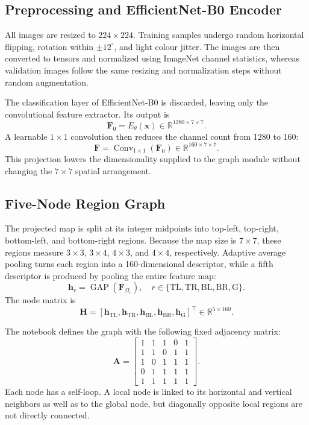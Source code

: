 \documentclass[10pt,conference]{IEEEtran}
\begin{document}
\subsection{Preprocessing and EfficientNet-B0 Encoder}

All images are resized to $224\times224$. Training samples undergo random horizontal flipping, rotation within $\pm12^{\circ}$, and light colour jitter. The images are then converted to tensors and normalized using ImageNet channel statistics, whereas validation images follow the same resizing and normalization steps without random augmentation.

The classification layer of EfficientNet-B0 is discarded, leaving only the convolutional feature extractor. Its output is
\begin{equation}
\mathbf{F}_{0}=E_{\theta}(\mathbf{x})
\in\mathbb{R}^{1280\times7\times7}.
\end{equation}
A learnable $1\times1$ convolution then reduces the channel count from 1280 to 160:
\begin{equation}
\mathbf{F}=\operatorname{Conv}_{1\times1}(\mathbf{F}_{0})
\in\mathbb{R}^{160\times7\times7}.
\end{equation}
This projection lowers the dimensionality supplied to the graph module without changing the $7\times7$ spatial arrangement.

\subsection{Five-Node Region Graph}

The projected map is split at its integer midpoints into top-left, top-right, bottom-left, and bottom-right regions. Because the map size is $7\times7$, these regions measure $3\times3$, $3\times4$, $4\times3$, and $4\times4$, respectively. Adaptive average pooling turns each region into a 160-dimensional descriptor, while a fifth descriptor is produced by pooling the entire feature map:
\begin{equation}
\mathbf{h}_{r}=\operatorname{GAP}(\mathbf{F}_{\Omega_r}),
\quad r\in\{\mathrm{TL,TR,BL,BR,G}\}.
\end{equation}
The node matrix is
\begin{equation}
\mathbf{H}=[\mathbf{h}_{\mathrm{TL}},\mathbf{h}_{\mathrm{TR}},
\mathbf{h}_{\mathrm{BL}},\mathbf{h}_{\mathrm{BR}},\mathbf{h}_{\mathrm{G}}]^{\top}
\in\mathbb{R}^{5\times160}.
\end{equation}

The notebook defines the graph with the following fixed adjacency matrix:
\begin{equation}
\mathbf{A}=\begin{bmatrix}
1&1&1&0&1\\
1&1&0&1&1\\
1&0&1&1&1\\
0&1&1&1&1\\
1&1&1&1&1
\end{bmatrix}.
\label{eq:adjacency}
\end{equation}
Each node has a self-loop. A local node is linked to its horizontal and vertical neighbors as well as to the global node, but diagonally opposite local regions are not directly connected.
\end{document}

